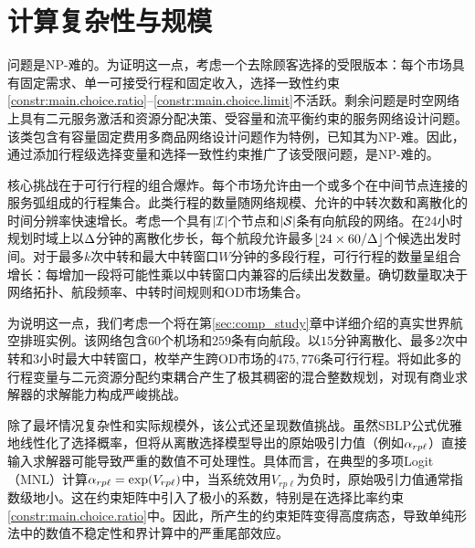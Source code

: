 \section{计算复杂性与规模}\label{sec:complexity}\label{sec:preconditioning}

\problemName 问题是NP-难的。为证明这一点，考虑一个去除顾客选择的受限版本：每个市场具有固定需求、单一可接受行程和固定收入，选择一致性约束\eqref{constr:main.choice.ratio}--\eqref{constr:main.choice.limit}不活跃。剩余问题是时空网络上具有二元服务激活和资源分配决策、受容量和流平衡约束的服务网络设计问题。该类包含有容量固定费用多商品网络设计问题作为特例，已知其为NP-难。因此，\problemName 通过添加行程级选择变量和选择一致性约束推广了该受限问题，是NP-难的。

核心挑战在于可行行程的组合爆炸。每个市场允许由一个或多个在中间节点连接的服务弧组成的行程集合。此类行程的数量随网络规模、允许的中转次数和离散化的时间分辨率快速增长。考虑一个具有$|\mathcal{I}|$个节点和$|\mathcal{S}|$条有向航段的网络。在24小时规划时域上以$\Delta$分钟的离散化步长，每个航段允许最多$\lfloor 24 \times 60 / \Delta \rfloor$个候选出发时间。对于最多$k$次中转和最大中转窗口$W$分钟的多段行程，可行行程的数量呈组合增长：每增加一段将可能性乘以中转窗口内兼容的后续出发数量。确切数量取决于网络拓扑、航段频率、中转时间规则和OD市场集合。

为说明这一点，我们考虑一个将在第\ref{sec:comp_study}章中详细介绍的真实世界航空排班实例。该网络包含$60$个机场和$259$条有向航段。以$15$分钟离散化、最多$2$次中转和$3$小时最大中转窗口，枚举产生跨OD市场的$475{,}776$条可行行程。将如此多的行程变量与二元资源分配约束耦合产生了极其稠密的混合整数规划，对现有商业求解器的求解能力构成严峻挑战。

除了最坏情况复杂性和实际规模外，该公式还呈现数值挑战。虽然SBLP公式优雅地线性化了选择概率，但将从离散选择模型导出的原始吸引力值（例如$\alpha_{rp\ell}$）直接输入求解器可能导致严重的数值不可处理性。具体而言，在典型的多项Logit（MNL）计算$\alpha_{rp\ell} = \exp(V_{rp\ell})$中，当系统效用$V_{rp\ell}$为负时，原始吸引力值通常指数级地小。这在约束矩阵中引入了极小的系数，特别是在选择比率约束\eqref{constr:main.choice.ratio}中。因此，所产生的约束矩阵变得高度病态，导致单纯形法中的数值不稳定性和界计算中的严重尾部效应。
